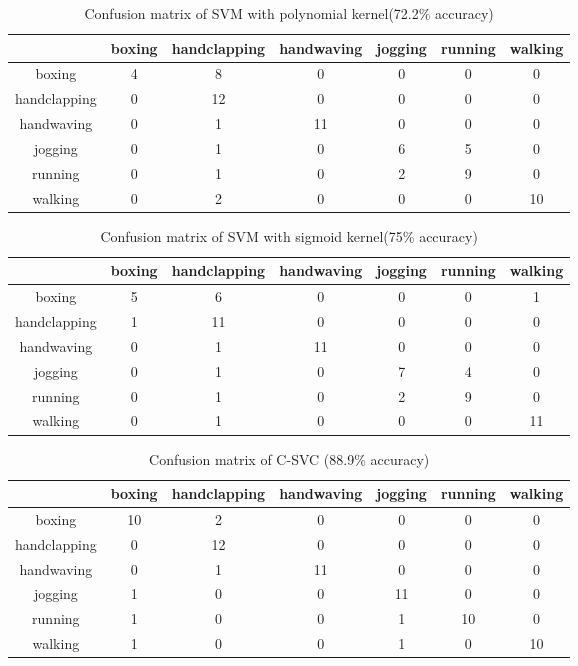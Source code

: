 \documentclass{article}
\begin{document}
\begin{table}[bh]
\caption{Confusion matrix of SVM with polynomial kernel(72.2\% accuracy)}
\begin{center}
\begin{tabular}{c|cccccc}\hline
&boxing&handclapping &handwaving &jogging &running &walking\\ \hline
boxing&4& 8& 0& 0& 0& 0\\
handclapping&0& 12& 0& 0& 0& 0\\
handwaving&0& 1& 11&0 &0 &0 \\
jogging&0& 1& 0&6 &5 &0 \\
running&0& 1&0&2 &9 &0 \\
walking&0&2 &0 &0 &0 &10 \\ \hline
\end{tabular}
\end{center}
\end{table} 

\begin{table}[bh]
\caption{Confusion matrix of SVM with sigmoid kernel(75\% accuracy)}
\begin{center}
\begin{tabular}{c|cccccc}\hline
&boxing&handclapping &handwaving &jogging &running &walking\\ \hline
boxing&5& 6& 0& 0& 0& 1\\
handclapping&1& 11& 0& 0& 0& 0\\
handwaving&0& 1& 11&0 &0 &0 \\
jogging&0& 1& 0&7 &4 &0 \\
running&0& 1&0&2 &9 &0 \\
walking&0&1 &0 &0 &0 &11 \\ \hline
\end{tabular}
\end{center}
\end{table} 

\begin{table}[bh]
\caption{Confusion matrix of C-SVC (88.9\% accuracy)}
\begin{center}
\begin{tabular}{c|cccccc}\hline
&boxing&handclapping &handwaving &jogging &running &walking\\ \hline
boxing&10& 2& 0& 0& 0& 0\\
handclapping&0& 12& 0& 0& 0& 0\\
handwaving&0& 1& 11&0 &0 &0 \\
jogging&1& 0& 0&11 &0 &0 \\
running&1& 0&0 &1 &10 &0 \\
walking&1&0 &0 &1 &0 &10 \\ \hline
\end{tabular}
\end{center}
\end{table} 
\end{document}
